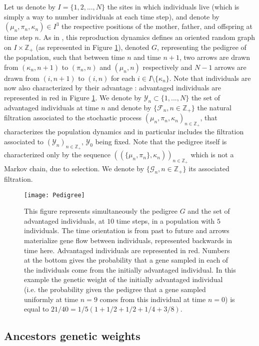 \documentclass[11pt]{article}
\theoremstyle{remark}
\numberwithin{equation}{section}
\begin{document}
Let us denote by $I=\{1,2,...,N\}$ the sites in which individuals live (which is simply a way to number individuals at each time step), and denote by $(\mu_n,\pi_n,\kappa_n)\in I^3$ the respective positions of the mother, father, and offspring at time step $n$. As in \cite{geneal}, this reproduction dynamics defines an oriented random graph on $I\times\mathbb{Z}_+$ (as represented in Figure \ref{FigPedigree}), denoted $G$, representing the pedigree of the population, such that between time $n$ and time $n+1$, two arrows are drawn from $(\kappa_n,n+1)$ to $(\pi_n,n)$ and $(\mu_n,n)$ respectively and $N-1$ arrows are drawn from $(i,n+1)$ to $(i,n)$ for each $i\in I\setminus\{\kappa_n\}$. Note that individuals are now also characterized by their advantage : advantaged individuals are represented in red in Figure \ref{FigPedigree}. We denote by $\mathcal{Y}_n\subset \{1,...,N\}$ the set of advantaged individuals at time $n$ and denote by $\{\mathcal{F}_n,n\in\mathbb{Z}_+\}$ the natural filtration associated to the stochastic process $(\mu_n,\pi_n,\kappa_n)_{n\in\mathbb{Z}_+}$, that characterizes the population dynamics and in particular includes the filtration associated to $(\mathcal{Y}_n)_{n\in\mathbb{Z}_+}$, $\mathcal{Y}_0$ being fixed. Note that the pedigree itself is characterized only by the sequence $((\{\mu_n,\pi_n\},\kappa_n))_{n\in\mathbb{Z}_+}$ which is not a Markov chain, due to selection. We denote by $\{\mathcal{G}_n,n\in\mathbb{Z}_+\}$ its associated filtration.

\begin{figure}[ht]
\begin{center}\texttt{[image: Pedigree]}
\end{center} 
\caption{This figure represents simultaneously the pedigree $G$ and the set of advantaged individuals, at $10$ time steps, in a population with $5$ individuals. The time orientation is from past to future and arrows materialize gene flow between individuals, represented backwards in time here. Advantaged individuals are represented in red. Numbers at the bottom gives the probability that a gene sampled in each of the individuals come from the initially advantaged individual. In this example the genetic weight of the initially advantaged individual (i.e. the probability  given the pedigree that a gene sampled uniformly at time $n=9$ comes from this individual at time $n=0$) is equal to $21/40=1/5(1+1/2+1/2+1/4+3/8).$\label{FigPedigree}}
\end{figure}


\subsection{Ancestors genetic weights}
\end{document}
